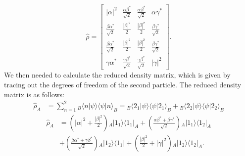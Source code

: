 \iffalse
\begin{equation}
\hat{\rho} = \begin{bmatrix} \langle 1_1 2_1 | \hat{\rho} | 1_1 2_1 \rangle & \langle 1_1 2_1 | \hat{\rho} | 1_1 2_2 \rangle & \langle 1_1 2_1 | \hat{\rho} | 1_2 2_1 \rangle & \langle 1_1 2_1 | \hat{\rho} | 1_2 2_2 \rangle \\ \langle 1_1 2_2 | \hat{\rho} | 1_1 2_1 \rangle & \langle 1_1 2_2 | \hat{\rho} | 1_1 2_2 \rangle & \langle 1_1 2_2 | \hat{\rho} | 1_2 2_1 \rangle & \langle 1_1 2_2 | \hat{\rho} | 1_2 2_2 \rangle \\ \langle 1_2 2_1 | \hat{\rho} | 1_1 2_1 \rangle & \langle 1_2 2_1 | \hat{\rho} | 1_1 2_2 \rangle & \langle 1_2 2_1 | \hat{\rho} | 1_2 2_1 \rangle & \langle 1_2 2_1 | \hat{\rho} | 1_2 2_2 \rangle \\ \langle 1_2 2_2 | \hat{\rho} | 1_1 2_1 \rangle & \langle 1_2 2_2 | \hat{\rho} | 1_1 2_2 \rangle & \langle 1_2 2_2 | \hat{\rho} | 1_2 2_1 \rangle & \langle 1_2 2_2 | \hat{\rho} | 1_2 2_2 \rangle \end{bmatrix} 
\end{equation}
\fi
\begin{equation}
\hat{\rho} = \begin{bmatrix} |\alpha|^2 & \frac{\alpha \beta^*}{\sqrt{2}} & \frac{\alpha \beta^*}{\sqrt{2}} & \alpha \gamma^* \\ \frac{\beta \alpha^*}{\sqrt{2}} & \frac{|\beta|^2}{2} & \frac{|\beta|^2}{2} & \frac{\beta \gamma^*}{\sqrt{2}} \\ \frac{\beta \alpha^*}{\sqrt{2}} & \frac{|\beta|^2}{2} & \frac{|\beta|^2}{2} & \frac{\beta \gamma^*}{\sqrt{2}} \\ \gamma \alpha^* & \frac{\gamma \beta^*}{\sqrt{2}} & \frac{\gamma \beta^*}{\sqrt{2}} & |\gamma|^2 \end{bmatrix}.
\end{equation}
\noindent We then needed to calculate the reduced density matrix, which is given by tracing out the degrees of freedom of the second particle. The reduced density matrix is as follows:
\begin{align}
\hat{\rho}_A &= \sum_{n=1}^{2} {}_B \langle n|\psi \rangle \langle \psi|n \rangle_B = {}_B\langle 2_1|\psi \rangle \langle \psi|2_1 \rangle_B + {}_B\langle 2_2|\psi \rangle \langle \psi|2_2 \rangle_B
\end{align}
\begin{align*}
\hat{\rho}_A &= \left( |\alpha|^2 + \frac{|\beta|^2}{2} \right) {}_A |1_1 \rangle \langle 1_1|_A
+ \left( \frac{\alpha \beta^* + \beta \gamma^*}{\sqrt{2}} \right) {}_A |1_1 \rangle \langle 1_2|_A \\
&+ \left( \frac{\beta \alpha^*+ \gamma \beta^*}{\sqrt{2}} \right) {}_A |1_2 \rangle \langle 1_1|
+ \left( \frac{|\beta|^2}{2} + |\gamma|^2 \right) {}_A |1_2 \rangle \langle 1_2|_A.
\end{align*}
